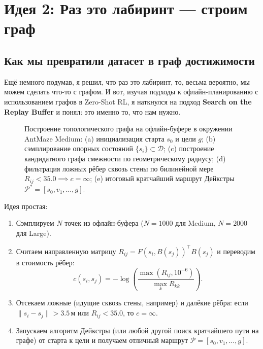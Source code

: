 \section{Идея 2: Раз это лабиринт — строим граф}

\subsection{Как мы превратили датасет в граф достижимости}
Ещё немного подумав, я решил, что раз это лабиринт, то, весьма вероятно, мы можем сделать что-то с графом.
И вот, изучая подходы к офлайн-планированию с использованием графов в Zero-Shot RL, я наткнулся на подход \textbf{Search on the Replay Buffer} \cite{eysenbach2019search} и понял: это именно то, что нам нужно.

\begin{figure}[t]
    \centering
    
    \caption{Построение топологического графа на офлайн-буфере в окружении AntMaze Medium: (a) инициализация старта $s_0$ и цели $g$; (b) сэмплирование опорных состояний $\{s_i\} \subset \mathcal{D}$; (c) построение кандидатного графа смежности по геометрическому радиусу; (d) фильтрация ложных рёбер сквозь стены по билинейной мере $R_{ij} < 35.0 \implies c = \infty$; (e) итоговый кратчайший маршрут Дейкстры $\mathcal{P}^* = [s_0, v_1, \dots, g]$.}
    \label{fig:search_on_buffer}
\end{figure}

Идея простая:
\begin{enumerate}[leftmargin=*,noitemsep]
    \item Сэмплируем $N$ точек из офлайн-буфера ($N=1000$ для Medium, $N=2000$ для Large).
    \item Считаем направленную матрицу $R_{ij} = F(s_i, B(s_j))^\top B(s_j)$ и переводим в стоимость рёбер:
    \begin{equation}
    \label{eq:graph_cost}
        c(s_i, s_j) = -\log \left( \frac{\max(R_{ij}, 10^{-6})}{\max_{k} R_{kk}} \right).
    \end{equation}
    \item Отсекаем ложные (идущие сквозь стены, например) и далёкие рёбра: если $\|s_i - s_j\| > 3.5\,\text{м}$ или $R_{ij} < 35.0$, то $c = \infty$.
    \item Запускаем алгоритм Дейкстры (или любой другой поиск кратчайшего пути на графе) от старта к цели и получаем отличный маршрут $\mathcal{P} = [s_0, v_1, \dots, g]$.
\end{enumerate}

